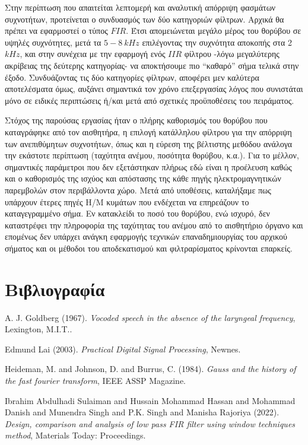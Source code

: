 \documentclass[breaklines=true, 12pt]{article}
\begin{document}
{{{Στην περίπτωση που απαιτείται λεπτομερή και αναλυτική απόρριψη φασμάτων
συχνοτήτων, προτείνεται ο συνδυασμός των δύο κατηγοριών φίλτρων. Αρχικά θα
πρέπει να εφαρμοστεί ο τύπος \(FIR\). Έτσι απομειώνεται μεγάλο μέρος του θορύβου
σε υψηλές συχνότητες, μετά τα \(5-8\ kHz\) επιλέγοντας την συχνότητα αποκοπής στα
2 \(kHz\), και στην συνέχεια με την εφαρμογή ενός \(IIR\) φίλτρου -λόγω μεγαλύτερης
ακρίβειας της δεύτερης κατηγορίας- να αποκτήσουμε πιο “καθαρό” σήμα τελικά στην
έξοδο. Συνδυάζοντας τις δύο κατηγορίες φίλτρων, αποφέρει μεν καλύτερα αποτελέσματα
όμως, αυξάνει σημαντικά τον χρόνο επεξεργασίας λόγος που συνιστάται μόνο σε
ειδικές περιπτώσεις ή/και μετά από σχετικές προϋποθέσεις του πειράματος.

Στόχος της παρούσας εργασίας ήταν ο πλήρης καθορισμός του θορύβου που
καταγράφηκε από τον αισθητήρα, η επιλογή κατάλληλου φίλτρου για την απόρριψη των
ανεπιθύμητων συχνοτήτων, όπως και η εύρεση της βέλτιστης μεθόδου ανάλογα την
εκάστοτε περίπτωση (ταχύτητα ανέμου, ποσότητα θορύβου, κ.α.). Για το μέλλον,
σημαντικές παράμετροι που δεν εξετάστηκαν πλήρως εδώ είναι η προέλευση καθώς και ο
καθορισμός της ισχύος και απόστασης της κάθε πηγής ηλεκτρομαγνητικών παρεμβολών
στον περιβάλλοντα χώρο. Μετά από υποθέσεις, καταλήξαμε πως υπάρχουν έτερες πηγές
Η/Μ κυμάτων που ενδέχεται να επηρεάζουν το καταγεγραμμένο σήμα. Εν κατακλείδι το
ποσό του θορύβου, ενώ ισχυρό, δεν καταστρέφει την πληροφορία της ταχύτητας του
ανέμου από το αισθητήριο όργανο και επομένως δεν υπάρχει ανάγκη εφαρμογής τεχνικών
επαναδημιουργίας του αρχικού σήματος και οι μέθοδοι του αποδεκατισμού και
φιλτραρίσματος κρίνονται επαρκείς.
\clearpage
\section{Βιβλιογραφία}
\label{sec:org76747d2}
\noindent
A. J. Goldberg (1967). \emph{Vocoded speech in the absence of the laryngeal frequency}, Lexington, M.I.T..

\noindent
Edmund Lai (2003). \emph{Practical Digital Signal Processing}, Newnes.

\noindent
Heideman, M. and Johnson, D. and Burrus, C. (1984). \emph{Gauss and the history of the fast fourier transform}, IEEE ASSP Magazine.

\noindent
Ibrahim Abdulhadi Sulaiman and Hussain Mohammad Hassan and Mohammad Danish and Munendra Singh and P.K. Singh and Manisha Rajoriya (2022). \emph{Design, comparison and analysis of low pass FIR filter using window techniques method}, Materials Today: Proceedings.

}}}
\end{document}
